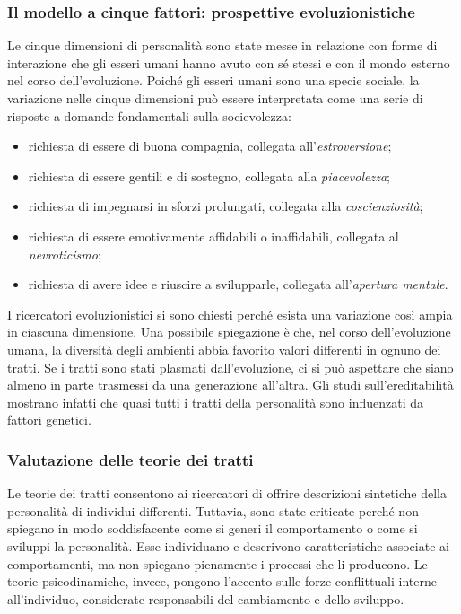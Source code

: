 \documentclass[a4paper]{article}
\begin{document}
\subsubsection{Il modello a cinque fattori: prospettive evoluzionistiche}
Le cinque dimensioni di personalità sono state messe in relazione con forme di interazione che gli esseri umani hanno avuto con sé stessi e con il mondo esterno nel corso dell'evoluzione.
Poiché gli esseri umani sono una specie sociale, la variazione nelle cinque dimensioni può essere interpretata come una serie di risposte a domande fondamentali sulla socievolezza:
\begin{itemize}
    \item richiesta di essere di buona compagnia, collegata all'\emph{estroversione};
    \item richiesta di essere gentili e di sostegno, collegata alla \emph{piacevolezza};
    \item richiesta di impegnarsi in sforzi prolungati, collegata alla \emph{coscienziosità};
    \item richiesta di essere emotivamente affidabili o inaffidabili, collegata al \emph{nevroticismo};
    \item richiesta di avere idee e riuscire a svilupparle, collegata all'\emph{apertura mentale}.
\end{itemize}
I ricercatori evoluzionistici si sono chiesti perché esista una variazione così ampia in ciascuna dimensione. Una possibile spiegazione è che, nel corso dell'evoluzione umana, la diversità degli ambienti abbia favorito valori differenti in ognuno dei tratti.
Se i tratti sono stati plasmati dall'evoluzione, ci si può aspettare che siano almeno in parte trasmessi da una generazione all'altra. Gli studi sull'ereditabilità mostrano infatti che quasi tutti i tratti della personalità sono influenzati da fattori genetici.
\subsubsection{Valutazione delle teorie dei tratti}
Le teorie dei tratti consentono ai ricercatori di offrire descrizioni sintetiche della personalità di individui differenti. Tuttavia, sono state criticate perché non spiegano in modo soddisfacente come si generi il comportamento o come si sviluppi la personalità.
Esse individuano e descrivono caratteristiche associate ai comportamenti, ma non spiegano pienamente i processi che li producono. Le teorie psicodinamiche, invece, pongono l'accento sulle forze conflittuali interne all'individuo, considerate responsabili del cambiamento e dello sviluppo.
\end{document}
